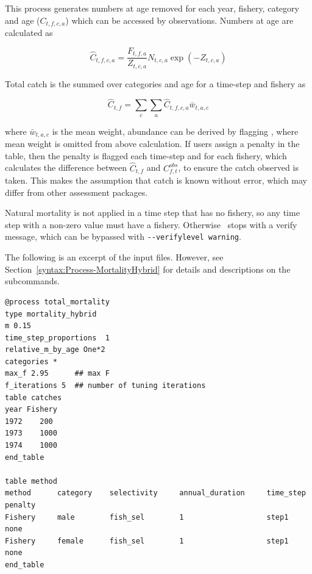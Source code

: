 This process generates numbers at age removed for each year, fishery, category and age (\(C_{t,f,c,a}\)) which can be accessed by  observations. Numbers at age are calculated as

\[
\widehat{C}_{t,f,c,a} = \frac{F_{t,f,a}}{Z_{t,c,a}} N_{t,c,a} \exp\left(-Z_{t,c,a}\right)
\]

Total catch is the summed over categories and age for a time-step and fishery as

\[
\widehat{C}_{t,f} = \sum\limits_c\sum\limits_a \widehat{C}_{t,f,c,a} \bar{w}_{t,a,c}
\]

where \(\bar{w}_{t,a,c}\) is the mean weight, abundance can be derived by flagging , where mean weight is omitted from above calculation. If users assign a penalty in the  table, then the penalty is flagged each time-step and for each fishery, which calculates the difference between \(\widehat{C}_{t,f}\) and \(C^{obs}_{f,t}\), to ensure the catch observed is taken. This makes the assumption that catch is known without error, which may differ from other assessment packages.

Natural mortality is not applied in a time step that has no fishery, so any time step with a non-zero  value must have a fishery. Otherwise \CNAME\ stops with a verify message, which can be bypassed with \texttt{-{}-verifylevel warning}.

The following is an excerpt of the input files. However, see Section~\ref{syntax:Process-MortalityHybrid} for details and descriptions on the subcommands.

{\small{\begin{verbatim}
@process total_mortality
type mortality_hybrid
m 0.15
time_step_proportions  1 
relative_m_by_age One*2
categories *
max_f 2.95		## max F
f_iterations 5  ## number of tuning iterations
table catches
year Fishery
1972	200
1973	1000
1974	1000
end_table

table method
method  	category 	selectivity 	annual_duration 	time_step  penalty	
Fishery   	male   		fish_sel 		1					step1 		none
Fishery  	female   	fish_sel 		1 					step1 		none	
end_table
\end{verbatim}}}

\paragraph{}\label{sec:Process-MortalityHollingRate} 

